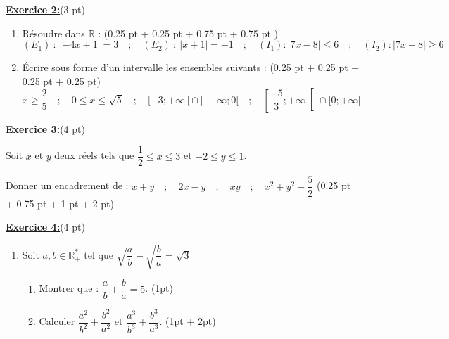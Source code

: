 \documentclass[12pt,a4paper]{article}
\begin{document}
\underline{\large\textbf{Exercice  2:}}(3 pt)
\begin{enumerate}
	\item Résoudre dans $\mathbb{R}$ : (0.25 pt + 0.25 pt + 0.75 pt  + 0.75 pt )
		$$(E_1) \ : \ |-4x + 1| = 3 \quad ; \quad (E_2) \ : \ |x + 1| = -1 \quad;\quad (I_1) : |7x - 8| \leq 6 \quad;\quad (I_2) : |7x - 8| \geq 6$$
	\item Écrire sous forme d’un intervalle les ensembles suivants : (0.25 pt + 0.25 pt + 0.25 pt + 0.25 pt)
	$$x\geq \dfrac{2}{5} \quad;\quad 0\leq x\leq \sqrt{5} \quad;\quad [-3;+\infty[\cap]-\infty;0[\quad;\quad \left[\dfrac{-5}{3};+\infty\right[\cap [0;+\infty[$$
\end{enumerate}

\underline{\large\textbf{Exercice  3:}}(4 pt)

Soit $x$ et $y$ deux réels tels que $\dfrac{1}{2}\leq x\leq 3$ et $-2\leq y\leq 1$.

Donner un encadrement de : $x + y\quad;\quad 2x - y \quad;\quad xy \quad;\quad x^2 + y^2 - \dfrac{5}{2}$ (0.25 pt + 0.75 pt + 1 pt + 2 pt)

\underline{\large\textbf{Exercice  4:}}(4 pt)
\begin{enumerate}
	\item Soit $a,b\in\mathbb{R}^*_+$ tel que $\sqrt{\dfrac{a}{b}} - \sqrt{\dfrac{b}{a}} = \sqrt{3}$
   	\begin{enumerate}
   		\item Montrer que : $\dfrac{a}{b} + \dfrac{b}{a} = 5$. (1pt)
   		\item Calculer $\dfrac{a^2}{b^2} + \dfrac{b^2}{a^2}$ et $\dfrac{a^3}{b^3} + \dfrac{b^3}{a^3}$. (1pt + 2pt)
   	\end{enumerate}
\end{enumerate}
\end{document}
